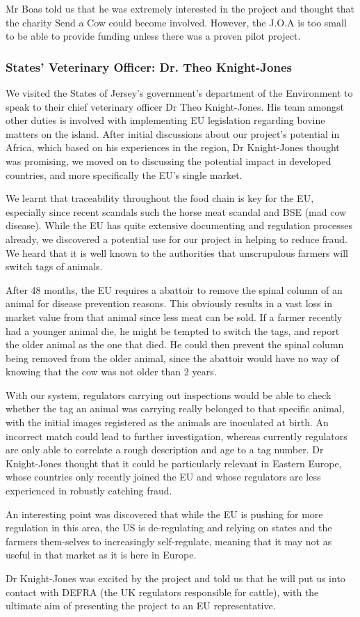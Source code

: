 Mr Boas told us that he was extremely interested in the project and thought that the charity Send a Cow could become involved. However, the J.O.A is too small to be able to provide funding unless there was a proven pilot project.
\subsubsection{States' Veterinary Officer: Dr. Theo Knight-Jones}

We visited the States of Jersey's government's department of the Environment to speak to their chief veterinary officer Dr Theo Knight-Jones. His team amongst other duties is involved with implementing EU legislation regarding bovine matters on the island. After initial discussions about our project's potential in Africa, which based on his experiences in the region, Dr Knight-Jones thought was promising, we moved on to discussing the potential impact in developed countries, and more specifically the EU's single market. 

We learnt that traceability throughout the food chain is key for the EU, especially since recent scandals such the horse meat scandal and BSE (mad cow disease). While the EU has quite extensive documenting and regulation processes already, we discovered a potential use for our project in helping to reduce fraud. We heard that it is well known to the authorities that unscrupulous farmers will switch tags of animals.

After 48 months, the EU requires a abattoir to remove the spinal column of an animal for disease prevention reasons. This obviously results in a vast loss in market value from that animal since less meat can be sold. If a farmer recently had a younger animal die, he might be tempted to switch the tags, and report the older animal as the one that died. He could then prevent the spinal column being removed from the older animal, since the abattoir would have no way of knowing that the cow was not older than 2 years.

With our system, regulators carrying out inspections would be able to check whether the tag an animal was carrying really belonged to that specific animal, with the initial images registered as the animals are inoculated at birth.  An incorrect match could lead to further investigation, whereas currently regulators are only able to correlate a rough description and age to a tag number. Dr Knight-Jones thought that it could be particularly relevant in Eastern Europe, whose countries only recently joined the EU and whose regulators are less experienced in robustly catching fraud.

An interesting point was discovered that while the EU is pushing for more regulation in this area, the US is de-regulating and relying on states and the farmers them-selves to increasingly self-regulate, meaning that it may not as useful in that market as it is here in Europe.

Dr Knight-Jones was excited by the project and told us that he will put us into contact with DEFRA (the UK regulators responsible for cattle), with the ultimate aim of presenting the project to an EU representative.   



